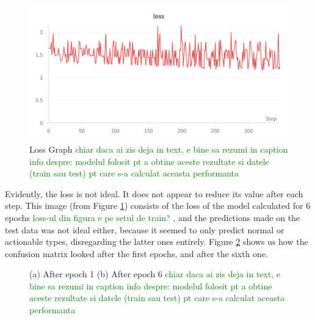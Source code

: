 \begin{figure}[!ht]
    \centering
    \includegraphics[width=1\textwidth]{figures/Figure8.png}
    \caption{Loss Graph
    \textcolor{green}{chiar daca ai zis deja in text, e bine sa rezumi in caption info despre: modelul folosit pt a obtine aceste rezultate si datele (train sau test) pt care s-a calculat aceasta performanta}
    }
    \label{fig:fig8}
\end{figure}

Evidently, the loss is not ideal. It does not appear to reduce its value after each step. This image (from Figure \ref{fig:fig8}) consists of the loss of the model calculated for 6 epochs 
\textcolor{green}{loss-ul din figura e pe setul de train?}
, and the predictions made on the test data was not ideal either, because it seemed to only predict normal or actionable types, disregarding the latter ones entirely. Figure \ref{fig:fig9} shows us how the confusion matrix looked after the first epochs, and after the sixth one.

\begin{figure}[!ht]
    \caption{(a) After epoch 1 (b) After epoch 6
    \textcolor{green}{chiar daca ai zis deja in text, e bine sa rezumi in caption info despre: modelul folosit pt a obtine aceste rezultate si datele (train sau test) pt care s-a calculat aceasta performanta}
    }
    \label{fig:fig9}
\end{figure}

